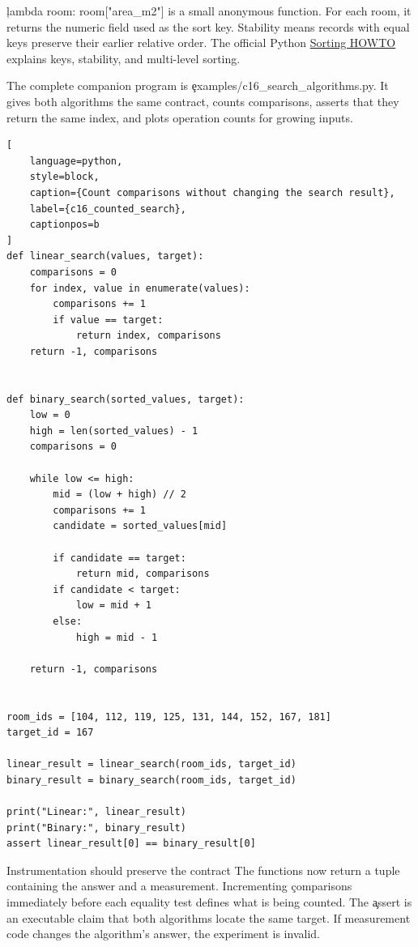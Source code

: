 \c{lambda room: room["area_m2"]} is a small anonymous function. For each room,
it returns the numeric field used as the sort key. Stability means records with
equal keys preserve their earlier relative order. The official Python
\href{https://docs.python.org/3/howto/sorting.html}{Sorting HOWTO} explains
keys, stability, and multi-level sorting.

\label{sec:c16-application}

The complete companion program is
\c{examples/c16_search_algorithms.py}. It gives both algorithms the same
contract, counts comparisons, asserts that they return the same index, and
plots operation counts for growing inputs.

\begin{lstlisting}[
    language=python,
    style=block,
    caption={Count comparisons without changing the search result},
    label={c16_counted_search},
    captionpos=b
]
def linear_search(values, target):
    comparisons = 0
    for index, value in enumerate(values):
        comparisons += 1
        if value == target:
            return index, comparisons
    return -1, comparisons


def binary_search(sorted_values, target):
    low = 0
    high = len(sorted_values) - 1
    comparisons = 0

    while low <= high:
        mid = (low + high) // 2
        comparisons += 1
        candidate = sorted_values[mid]

        if candidate == target:
            return mid, comparisons
        if candidate < target:
            low = mid + 1
        else:
            high = mid - 1

    return -1, comparisons


room_ids = [104, 112, 119, 125, 131, 144, 152, 167, 181]
target_id = 167

linear_result = linear_search(room_ids, target_id)
binary_result = binary_search(room_ids, target_id)

print("Linear:", linear_result)
print("Binary:", binary_result)
assert linear_result[0] == binary_result[0]
\end{lstlisting}

\begin{SyntaxBox}{Instrumentation should preserve the contract}
The functions now return a tuple containing the answer and a measurement.
Incrementing \c{comparisons} immediately before each equality test defines what
is being counted. The \c{assert} is an executable claim that both algorithms
locate the same target. If measurement code changes the algorithm's answer, the
experiment is invalid.
\end{SyntaxBox}

